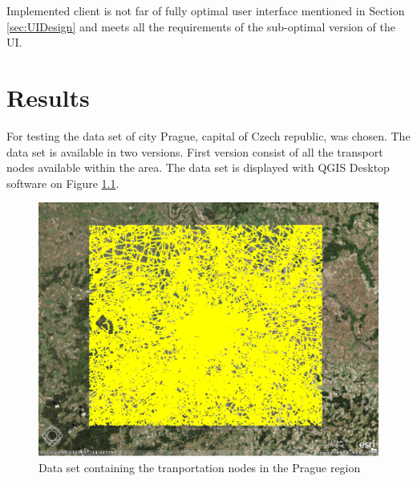 \documentclass[thesis=M,english]{FITthesis}[2012/10/20]
\begin{document}
Implemented client is not far of fully optimal user interface mentioned in Section \ref{sec:UIDesign} and meets all the requirements of the sub-optimal version of the UI. 


\chapter{Results}
\label{ch:Results}

For testing the data set of city Prague, capital of Czech republic, was chosen. The data set is available in two versions. First version consist of all the transport nodes available within the area. 
The data set is displayed with QGIS Desktop software on Figure \ref{pic:dataset1}.
\begin{figure}[H]
\centering
\includegraphics[width=1\textwidth]{pics/praguedatasetL}
\caption{Data set containing the tranportation nodes in the Prague region}
\label{pic:dataset1}
\end{figure}
\end{document}

